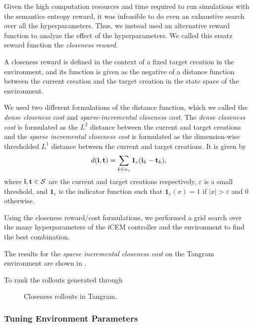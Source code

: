 Given the high computation resources and time required to run simulations with the semantics entropy reward, it was infeasible to do even an exhaustive search over all the hyperparameters.
Thus, we instead used an alternative reward function to analyze the effect of the hyperparameters.
We called this ersatz reward function the \emph{closeness reward}.

A closeness reward is defined in the context of a fixed target creation in the environment, and its function is given as the negative of a distance function between the current creation and the target creation in the state space of the environment.

We used two different formulations of the distance function, which we called the \emph{dense closeness cost} and \emph{sparse-incremental closeness cost}.
The \emph{dense closeness cost} is formulated as the \(L^2\) distance between the current and target creations and the \emph{sparse incremental closeness cost} is formulated as the dimension-wise thresholded \(L^1\) distance between the current and target creations. It is given by 
\begin{equation}
    \label{eq:closeness-reward-sparse}
    d(\mathbf{i}, \mathbf{t}) = \sum_{k \in n_s} \bm{1}_\varepsilon(\mathbf{i}_k - \mathbf{t}_k),
\end{equation}
where \(\mathbf{i}, \mathbf{t} \in \mathcal{S}\) are the current and target creations respectively, \(\varepsilon\) is a small threshold, and \(\bm{1}_\varepsilon\) is the indicator function such that \(\bm{1}_\varepsilon(x) = 1\) if \(|x| > \varepsilon\) and \(0\) otherwise.

Using the closeness reward/cost formulations, we performed a grid search over the many hyperparameters of the iCEM controller and the environment to find the best combination.

The results for the \emph{sparse incremental closeness cost} on the Tangram environment are shown in .

To rank the rollouts generated through 

\begin{figure}[h]
    \centering
    \caption{Closeness rollouts in Tangram.}
    \label{fig:closeness-rollouts}
\end{figure}


\subsubsection{Tuning Environment Parameters}
\label{sec:env-hyperparameters}


